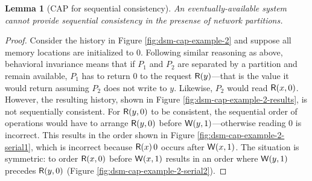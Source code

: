 \documentclass[]             %
{NASA}                       %
\newtheorem{lemma}[theorem]{Lemma}
\theoremstyle{definition}
\begin{document}
\begin{lemma}[CAP for sequential consistency]
  \label{thm:cap-sequential}
  An eventually-available system cannot provide sequential consistency
  in the presense of network partitions.
\end{lemma}
\begin{proof}
  Consider the history in Figure \ref{fig:dsm-cap-example-2} and
  suppose all memory locations are initialized to $0$. Following
  similar reasoning as above, behavioral invariance means that if
  $P_1$ and $P_2$ are separated by a partition and remain available,
  $P_1$ has to return $0$ to the request $\mathsf{R}\!\left(y\right)$---that is the
  value it would return assuming $P_2$ does not write to
  $y$. Likewise, $P_2$ would read $\mathsf{R}\!\left(x, 0\right)$. However, the
  resulting history, shown in Figure
  \ref{fig:dsm-cap-example-2-results}, is not sequentially
  consistent. For $\mathsf{R}\!\left(y, 0\right)$ to be consistent, the sequential
  order of operations would have to arrange $\mathsf{R}\!\left(y, 0\right)$ before
  $\mathsf{W}\!\left(y, 1\right)$---otherwise reading $0$ is incorrect. This results
  in the order shown in Figure \ref{fig:dsm-cap-example-2-serial1},
  which is incorrect because $\mathsf{R}\!\left(x\right){0}$ occurs after
  $\mathsf{W}\!\left(x, 1\right)$. The situation is symmetric: to order
  $\mathsf{R}\!\left(x, 0\right)$ before $\mathsf{W}\!\left(x, 1\right)$ results in an order where
  $\mathsf{W}\!\left(y, 1\right)$ precedes $\mathsf{R}\!\left(y, 0\right)$ (Figure \ref{fig:dsm-cap-example-2-serial2}).

\end{proof}
\end{document}
